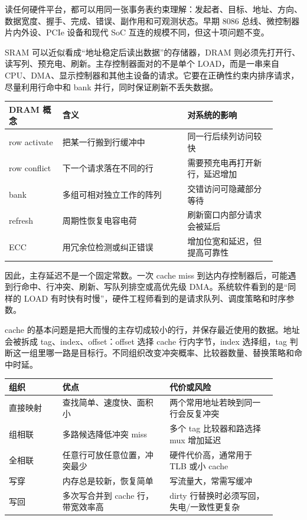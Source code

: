 \begin{classicnote}
读任何硬件平台，都可以用同一张事务表约束理解：发起者、目标、地址、方向、数据宽度、握手、完成、错误、副作用和可观测状态。早期 8086 总线、微控制器片内外设、PCIe 设备和现代 SoC 互连的规模不同，但这十项问题不变。
\end{classicnote}

SRAM 可以近似看成“地址稳定后读出数据”的存储器，DRAM 则必须先打开行、读写列、预充电、刷新。主存控制器面对的不是单个 LOAD，而是一串来自 CPU、DMA、显示控制器和其他主设备的请求。它要在正确性约束内排序请求，尽量利用行命中和 bank 并行，同时保证刷新不丢失数据。

\begin{longtable}{L{0.18\linewidth}L{0.42\linewidth}L{0.3\linewidth}}
\toprule
DRAM 概念 & 含义 & 对系统的影响 \\
\midrule
row activate & 把某一行搬到行缓冲中 & 同一行后续列访问较快 \\
row conflict & 下一个请求落在不同的行 & 需要预充电再打开新行，延迟增加 \\
bank & 多组可相对独立工作的阵列 & 交错访问可隐藏部分等待 \\
refresh & 周期性恢复电容电荷 & 刷新窗口内部分请求会被延后 \\
ECC & 用冗余位检测或纠正错误 & 增加位宽和延迟，但提高可靠性 \\
\bottomrule
\end{longtable}

因此，主存延迟不是一个固定常数。一次 cache miss 到达内存控制器后，可能遇到行命中、行冲突、刷新、写队列排空或高优先级 DMA。系统软件看到的是“同样的 LOAD 有时快有时慢”，硬件工程师看到的是请求队列、调度策略和时序参数。

cache 的基本问题是把大而慢的主存切成较小的行，并保存最近使用的数据。地址会被拆成 tag、index、offset：offset 选择 cache 行内字节，index 选择组，tag 判断这一组里哪一路是目标行。不同组织改变冲突概率、比较器数量、替换策略和命中时延。

\begin{longtable}{L{0.18\linewidth}L{0.36\linewidth}L{0.36\linewidth}}
\toprule
组织 & 优点 & 代价或风险 \\
\midrule
直接映射 & 查找简单、速度快、面积小 & 两个常用地址若映到同一行会反复冲突 \\
组相联 & 多路候选降低冲突 miss & 多个 tag 比较器和路选择 mux 增加延迟 \\
全相联 & 任意行可放任意位置，冲突最少 & 硬件代价高，通常用于 TLB 或小 cache \\
写穿 & 内存总是较新，恢复简单 & 写流量大，常需写缓冲 \\
写回 & 多次写合并到 cache 行，带宽效率高 & dirty 行替换时必须写回，失电/一致性更复杂 \\
\bottomrule
\end{longtable}

